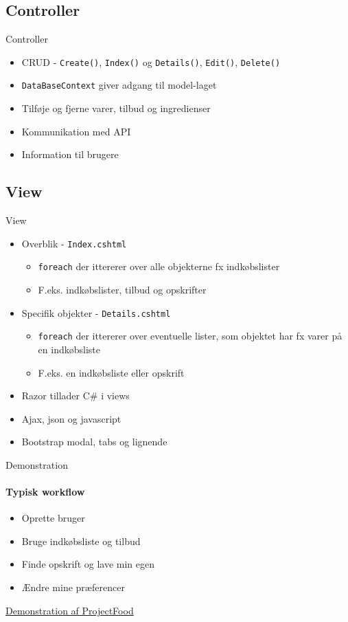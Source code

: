 \subsection{Controller}
\begin{frame}{Controller}
	\begin{itemize}
		\item CRUD - \texttt{Create()}, \texttt{Index()} og \texttt{Details()}, \texttt{Edit()}, \texttt{Delete()}
		\item \texttt{DataBaseContext} giver adgang til model-laget
		\vspace{15pt}
		\item Tilføje og fjerne varer, tilbud og ingredienser
		\item Kommunikation med API
		\item Information til brugere
	\end{itemize}
\end{frame}

\subsection{View}
\begin{frame}{View}
	\begin{itemize}
		\item Overblik - \texttt{Index.cshtml}
		\begin{itemize}
			\item \texttt{foreach} der ittererer over alle objekterne fx indkøbslister
			\item F.eks. indkøbslister, tilbud og opskrifter
		\end{itemize}
		\item Specifik objekter - \texttt{Details.cshtml}
		\begin{itemize}
			\item \texttt{foreach} der ittererer over eventuelle lister, som objektet har fx varer på en indkøbsliste
			\item F.eks. en indkøbsliste eller opskrift
		\end{itemize}
		\item Razor tillader C\# i views
		\item Ajax, json og javascript
		\item Bootstrap modal, tabs og lignende
	\end{itemize}
\end{frame}

\begin{frame}{Demonstration}
	\framesubtitle{Typisk workflow}
	\begin{itemize}
	\item Oprette bruger
	\item Bruge indkøbsliste og tilbud
	\item Finde opskrift og lave min egen
	\item Ændre mine præferencer
	\end{itemize}
	\href{http://james:8080}{Demonstration af ProjectFood}
\end{frame}
